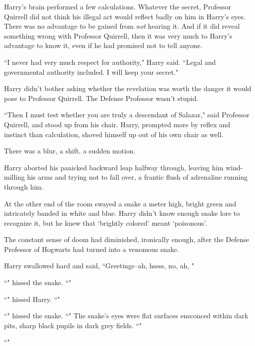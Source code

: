 Harry's brain performed a few calculations. Whatever the secret, Professor Quirrell did not think his illegal act would reflect badly on him in Harry's eyes. There was no advantage to be gained from \emph{not} hearing it. And if it did reveal something wrong with Professor Quirrell, then it was very much to Harry's advantage to know it, even if he had promised not to tell anyone.

``I never had very much respect for authority," Harry said. ``Legal and governmental authority included. I will keep your secret."

Harry didn't bother asking whether the revelation was worth the danger it would pose to Professor Quirrell. The Defense Professor wasn't stupid.

``Then I must test whether you are truly a descendant of Salazar," said Professor Quirrell, and stood up from his chair. Harry, prompted more by reflex and instinct than calculation, shoved himself up out of his own chair as well.

There was a blur, a shift, a sudden motion.

Harry aborted his panicked backward leap halfway through, leaving him wind-milling his arms and trying not to fall over, a frantic flush of adrenaline running through him.

At the other end of the room swayed a snake a meter high, bright green and intricately banded in white and blue. Harry didn't know enough snake lore to recognize it, but he knew that `brightly colored' meant `poisonous'.

The constant sense of doom had diminished, ironically enough, after the Defense Professor of Hogwarts had turned into a venomous snake.

Harry swallowed hard and said, ``Greetings\---ah, hssss, no, ah, "

``" hissed the snake. ``"

``" hissed Harry. ``"

``" hissed the snake. ``" The snake's eyes were flat surfaces ensconced within dark pits, sharp black pupils in dark grey fields. ``"

``"

